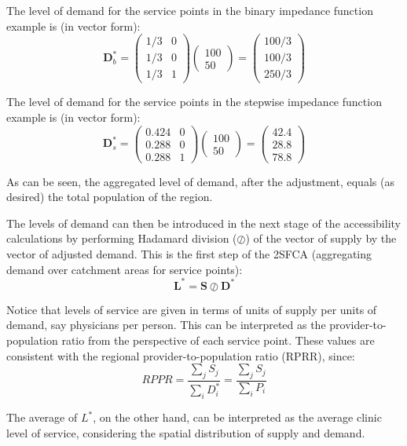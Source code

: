 \documentclass[10pt,letterpaper]{article}
\begin{document}
The level of demand for the service points in the binary impedance
function example is (in vector form): \[
\mathbf{D}^*_b= \left( \begin{array}{cc}
1/3 & 0\\
1/3 & 0\\
1/3 & 1\end{array} \right)
\left( \begin{array}{c}
100\\
50\end{array} \right)=
\left( \begin{array}{c}
100/3\\
100/3\\
250/3
\end{array} \right)
\]

The level of demand for the service points in the stepwise impedance
function example is (in vector form): \[
\mathbf{D}^*_s= \left( \begin{array}{cc}
0.424 & 0\\
0.288 & 0\\
0.288 & 1\end{array} \right)
\left( \begin{array}{c}
100\\
50\end{array} \right)=
\left( \begin{array}{c}
42.4\\
28.8\\
78.8
\end{array} \right)
\]

As can be seen, the aggregated level of demand, after the adjustment,
equals (as desired) the total population of the region.

The levels of demand can then be introduced in the next stage of the
accessibility calculations by performing Hadamard division (\(\oslash\))
of the vector of supply by the vector of adjusted demand. This is the
first step of the 2SFCA (aggregating demand over catchment areas for
service points): \[
\mathbf{L}^* = \mathbf{S}\oslash\mathbf{D}^*
\]

Notice that levels of service are given in terms of units of supply per
units of demand, say physicians per person. This can be interpreted as
the provider-to-population ratio from the perspective of each service
point. These values are consistent with the regional
provider-to-population ratio (RPRR), since: \[
RPPR = \frac{\sum_jS_j}{\sum_iD^*_i} = \frac{\sum_jS_j}{\sum_iP_i}
\]

The average of \(L^*\), on the other hand, can be interpreted as the
average clinic level of service, considering the spatial distribution of
supply and demand.
\end{document}
